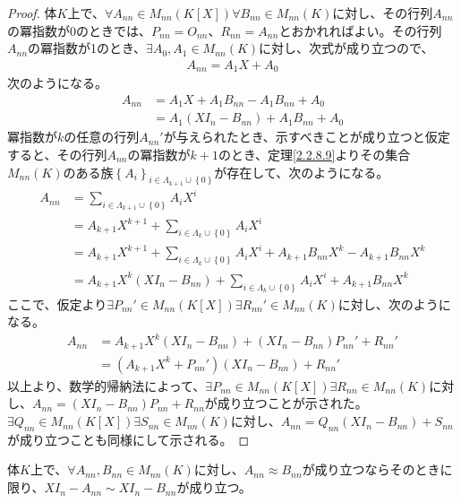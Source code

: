 \documentclass[dvipdfmx]{jsarticle}
\begin{document}
\begin{proof}
体$K$上で、$\forall A_{nn} \in M_{nn}\left( K[ X] \right)\forall B_{nn} \in M_{nn}(K)$に対し、その行列$A_{nn}$の冪指数が0のときでは、$P_{nn} = O_{nn}$、$R_{nn} = A_{nn}$とおかれればよい。その行列$A_{nn}$の冪指数が1のとき、$\exists A_{0},A_{1} \in M_{nn}(K)$に対し、次式が成り立つので、
\begin{align*}
A_{nn} = A_{1}X + A_{0}
\end{align*}
次のようになる。
\begin{align*}
A_{nn} &= A_{1}X + A_{1}B_{nn} - A_{1}B_{nn} + A_{0}\\
&= A_{1}\left( XI_{n} - B_{nn} \right) + A_{1}B_{nn} + A_{0}
\end{align*}
冪指数が$k$の任意の行列$A_{nn}'$が与えられたとき、示すべきことが成り立つと仮定すると、その行列$A_{nn}$の冪指数が$k + 1$のとき、定理\ref{2.2.8.9}よりその集合$M_{nn}(K)$のある族$\left\{ A_{i} \right\}_{i \in \varLambda_{k + 1} \cup \left\{ 0 \right\}}$が存在して、次のようになる。
\begin{align*}
A_{nn} &= \sum_{i \in \varLambda_{k + 1} \cup \left\{ 0 \right\}} {A_{i}X^{i}}\\
&= A_{k + 1}X^{k + 1} + \sum_{i \in \varLambda_{k} \cup \left\{ 0 \right\}} {A_{i}X^{i}}\\
&= A_{k + 1}X^{k + 1} + \sum_{i \in \varLambda_{k} \cup \left\{ 0 \right\}} {A_{i}X^{i}} + A_{k + 1}B_{nn}X^{k} - A_{k + 1}B_{nn}X^{k}\\
&= A_{k + 1}X^{k}\left( XI_{n} - B_{nn} \right) + \sum_{i \in \varLambda_{k} \cup \left\{ 0 \right\}} {A_{i}X^{i}} + A_{k + 1}B_{nn}X^{k}
\end{align*}
ここで、仮定より$\exists P_{nn}' \in M_{nn}\left( K[ X] \right)\exists R_{nn}' \in M_{nn}(K)$に対し、次のようになる。
\begin{align*}
A_{nn} &= A_{k + 1}X^{k}\left( XI_{n} - B_{nn} \right) + \left( XI_{n} - B_{nn} \right)P_{nn}' + R_{nn}'\\
&= \left( A_{k + 1}X^{k} + P_{nn}' \right)\left( XI_{n} - B_{nn} \right) + R_{nn}'
\end{align*}
以上より、数学的帰納法によって、$\exists P_{nn} \in M_{nn}\left( K[ X] \right)\exists R_{nn} \in M_{nn}(K)$に対し、$A_{nn} = \left( XI_{n} - B_{nn} \right)P_{nn} + R_{nn}$が成り立つことが示された。$\exists Q_{nn} \in M_{nn}\left( K[ X] \right)\exists S_{nn} \in M_{nn}(K)$に対し、$A_{nn} = Q_{nn}\left( XI_{n} - B_{nn} \right) + S_{nn}$が成り立つことも同様にして示される。
\end{proof}
\begin{thm}\label{2.2.8.11}
体$K$上で、$\forall A_{nn},B_{nn} \in M_{nn}(K)$に対し、$A_{nn} \approx B_{nn}$が成り立つならそのときに限り、$XI_{n} - A_{nn} \sim XI_{n} - B_{nn}$が成り立つ。
\end{thm}
\end{document}
